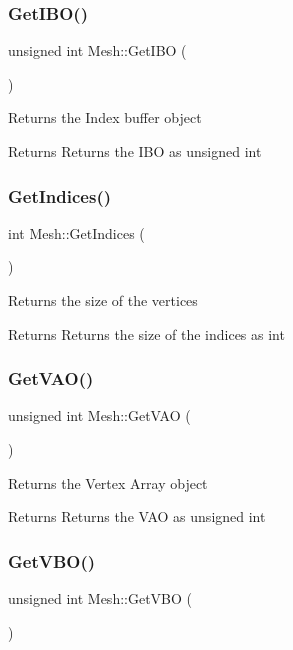 \subsubsection{\texorpdfstring{GetIBO()}{GetIBO()}}
{\footnotesize\ttfamily unsigned int Mesh\+::\+Get\+I\+BO (\begin{DoxyParamCaption}{ }\end{DoxyParamCaption})}

Returns the Index buffer object \begin{DoxyReturn}{Returns}
Returns the I\+BO as unsigned int 
\end{DoxyReturn}
\mbox{\label{class_mesh_a70161b8fbe973d74f2509b5524e16e79}} 
\subsubsection{\texorpdfstring{GetIndices()}{GetIndices()}}
{\footnotesize\ttfamily int Mesh\+::\+Get\+Indices (\begin{DoxyParamCaption}{ }\end{DoxyParamCaption})}

Returns the size of the vertices \begin{DoxyReturn}{Returns}
Returns the size of the indices as int 
\end{DoxyReturn}
\mbox{\label{class_mesh_aafa13fa13ca5fb5e15b544ae1870da45}} 
\subsubsection{\texorpdfstring{GetVAO()}{GetVAO()}}
{\footnotesize\ttfamily unsigned int Mesh\+::\+Get\+V\+AO (\begin{DoxyParamCaption}{ }\end{DoxyParamCaption})}

Returns the Vertex Array object \begin{DoxyReturn}{Returns}
Returns the V\+AO as unsigned int 
\end{DoxyReturn}
\mbox{\label{class_mesh_a4970bf6ecdcc4bc417e49524393f1cea}} 
\subsubsection{\texorpdfstring{GetVBO()}{GetVBO()}}
{\footnotesize\ttfamily unsigned int Mesh\+::\+Get\+V\+BO (\begin{DoxyParamCaption}{ }\end{DoxyParamCaption})}

